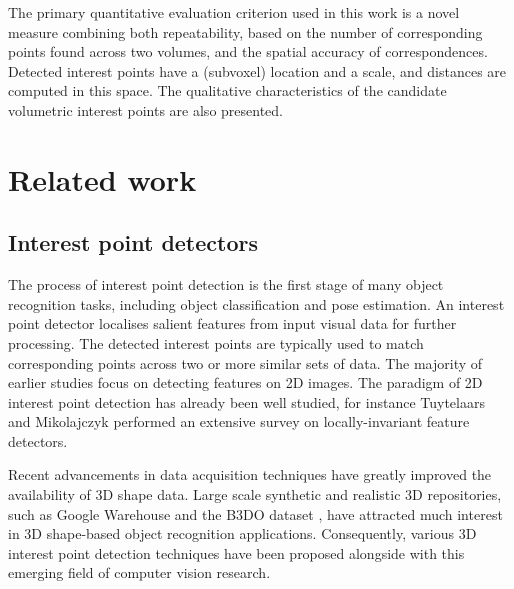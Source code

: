The primary quantitative evaluation criterion used in this work is a novel measure combining both repeatability, based on the number of corresponding points found across two volumes, and the spatial accuracy of correspondences. Detected interest points have a (subvoxel) location and a scale, and distances are computed in this space. The qualitative characteristics of the candidate volumetric interest points are also presented. 

\section{Related work}
\label{sec/eval/relatedwork}

\subsection{Interest point detectors}

The process of interest point detection is the first stage of many object recognition tasks, including object classification and pose estimation. An interest point detector localises salient features from input visual data for further processing. The detected interest points are typically used to match corresponding points across two or more similar sets of data. 
The majority of earlier studies focus on detecting features on 2D images. The paradigm of 2D interest point detection has already been well studied, for instance Tuytelaars and Mikolajczyk \cite{Tuytelaars2008} performed an extensive survey on locally-invariant feature detectors.  

Recent advancements in data acquisition techniques have greatly improved the availability of 3D shape data. Large scale synthetic and realistic 3D repositories, such as Google Warehouse \cite{Lai2010} and the B3DO dataset \cite{Janoch2011}, have attracted much interest in 3D shape-based object recognition applications. Consequently, various 3D interest point detection techniques have been proposed alongside with this emerging field of computer vision research. 

